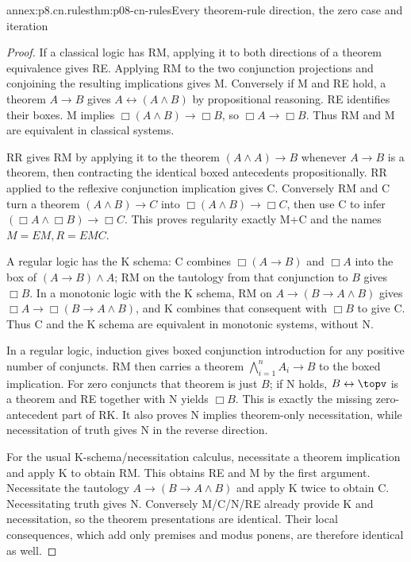 \begin{annexitem}{annex:p8.cn.rules}{thm:p08-cn-rules}{Every theorem-rule direction, the zero case and iteration}
\begin{proof}
If a classical logic has RM, applying it to both directions of a
theorem equivalence gives RE. Applying RM to the two conjunction
projections and conjoining the resulting implications gives M.
Conversely if M and RE hold, a theorem \(A\to B\) gives
\(A\leftrightarrow(A\land B)\) by propositional reasoning.
RE identifies their boxes. M implies
\(\Box(A\land B)\to\Box B\), so \(\Box A\to\Box B\).
Thus RM and M are equivalent in classical systems.

RR gives RM by applying it to the theorem
\((A\land A)\to B\) whenever \(A\to B\) is a theorem,
then contracting the identical boxed antecedents propositionally.
RR applied to the reflexive conjunction implication gives C.
Conversely RM and C turn a theorem \((A\land B)\to C\)
into \(\Box(A\land B)\to\Box C\), then use C to infer
\((\Box A\land\Box B)\to\Box C\). This proves
regularity exactly M+C and the names \(M=EM,R=EMC\).

A regular logic has the K schema: C combines
\(\Box(A\to B)\) and \(\Box A\) into the box of
\((A\to B)\land A\); RM on the tautology from that conjunction
to \(B\) gives \(\Box B\). In a monotonic logic with the
K schema, RM on \(A\to(B\to A\land B)\) gives
\(\Box A\to\Box(B\to A\land B)\), and K combines
that consequent with \(\Box B\) to give C. Thus C and
the K schema are equivalent in monotonic systems, without N.

In a regular logic, induction gives boxed conjunction introduction
for any positive number of conjuncts. RM then carries a theorem
\(\bigwedge_{i=1}^nA_i\to B\) to the boxed implication.
For zero conjuncts that theorem is just \(B\); if N holds,
\(B\leftrightarrow\topv\) is a theorem and RE together
with N yields \(\Box B\). This is exactly the missing
zero-antecedent part of RK. It also proves N implies theorem-only
necessitation, while necessitation of truth gives N in the reverse
direction.

For the usual K-schema/necessitation calculus, necessitate a theorem
implication and apply K to obtain RM. This obtains RE and M by
the first argument. Necessitate the tautology
\(A\to(B\to A\land B)\) and apply K twice to obtain C.
Necessitating truth gives N. Conversely M/C/N/RE already provide
K and necessitation, so the theorem presentations are identical.
Their local consequences, which add only premises and modus ponens,
are therefore identical as well.


\end{proof}
\end{annexitem}
